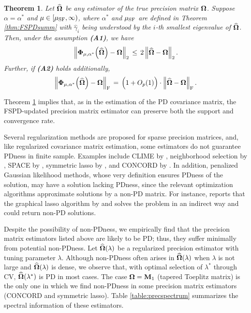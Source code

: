 \documentclass[times,sort&compress,3p]{elsarticle}
\newtheorem{theorem}{Theorem}
\begin{document}
%
\begin{theorem}%
\label{thm:FSPDprec}
Let $\widehat{\bf \Omega}$ be any estimator of the true precision matrix ${\bf \Omega}$. 
Suppose $\alpha=\alpha^*$ and $\mu \in [\mu_{\rm SF}, \infty)$, 
where $\alpha^*$ and $\mu_{\rm SF}$ are defined in Theorem \ref{thm:FSPDsumm} with 
$\widehat{\gamma}_i$ being understood by the $i$-th smallest eigenvalue of $\widehat{\bf \Omega}$.  Then, under the assumption {\bf (A1)},
we have
\[
\left\| {\bf \Phi}_{\mu, \alpha^*}\Big(\widehat{\bf \Omega}\Big) - {\bf \Omega} \right\|_2 \,\leq\,
	2\left\| \widehat{\bf \Omega} - {\bf \Omega} \right\|_2.
\]
Further, if {\bf (A2)} holds additionally,
\[
\left\| {\bf \Phi}_{\mu, \alpha^*}\Big(\widehat{\bf \Omega}\Big) - {\bf \Omega} \right\|_{\rm F} \,=\,
	\Big( 1 + O_p(1) \Big) \cdot
	\left\| \widehat{\bf \Omega} - {\bf \Omega} \right\|_{\rm F}.
\]
\end{theorem}
Theorem \ref{thm:FSPDprec} implies that, as in the estimation of the PD covariance matrix, the FSPD-updated precision
matrix estimator can preserve both the support and convergence rate. 


Several regularization methods are proposed for sparse precision matrices, and, like regularized covariance matrix estimation,
 some estimators do not guarantee PDness in  finite sample. Examples include CLIME
 by \citet{Cai2011}, neighborhood selection by \citet{Meinshausen2006}, SPACE by \citet{Peng2009}, symmetric lasso
 by \citet{Friedman2010}, and CONCORD by \citet{Khare2015}. In addition, penalized Gaussian likelihood methods,
 whose very definition ensures PDness of the solution, may have a solution lacking PDness, since the relevant optimization
 algorithms approximate solutions by a non-PD matrix. For instance, \citet{Mazumder2012} reports that the graphical
 lasso algorithm by \citet{Friedman2008} and \citet{Witten2011} solves the problem in an indirect way and could return non-PD
 solutions.


Despite the possibility of non-PDness, we empirically find that the precision matrix estimators listed
above are likely to be PD; thus, they suffer minimally from potential non-PDness. Let $\widehat{\bf \Omega}(\lambda)$ be
 a regularized precision estimator with tuning parameter $\lambda$. Although non-PDness often arises in
 $\widehat{\bf \Omega}(\lambda)$ when $\lambda$ is not large and $\widehat{\bf \Omega}(\lambda)$ is dense,
 we observe that, with optimal selection of $\lambda^*$ through CV, $\widehat{\bf \Omega}(\lambda^*)$ is
 PD in most cases. The case ${\bf \Omega}={\bf M}_1$ (tapered Toeplitz matrix) is the only one in which we find non-PDness
 in some precision matrix estimators (CONCORD and symmetric lasso). Table \ref{table:precspectrum} summarizes the
 spectral information of these estimators.
\end{document}
